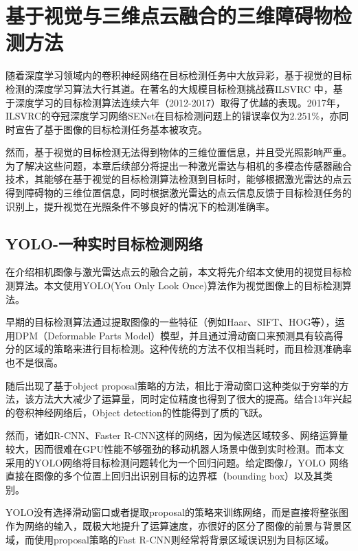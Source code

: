 
\chapter{基于视觉与三维点云融合的三维障碍物检测方法}

随着深度学习领域内的卷积神经网络在目标检测任务中大放异彩，基于视觉的目标检测的深度学习算法大行其道。在著名的大规模目标检测挑战赛ILSVRC 中，基于深度学习的目标检测算法连续六年（2012-2017）取得了优越的表现。2017年，ILSVRC的夺冠深度学习网络SENet在目标检测问题上的错误率仅为$2.251 \%$，亦同时宣告了基于图像的目标检测任务基本被攻克。

然而，基于视觉的目标检测无法得到物体的三维位置信息，并且受光照影响严重。为了解决这些问题，本章后续部分将提出一种激光雷达与相机的多模态传感器融合技术，其能够在基于视觉的目标检测算法检测到目标时，能够根据激光雷达的点云得到障碍物的三维位置信息，同时根据激光雷达的点云信息反馈于目标检测任务的识别上，提升视觉在光照条件不够良好的情况下的检测准确率。

\section{YOLO-一种实时目标检测网络}

在介绍相机图像与激光雷达点云的融合之前，本文将先介绍本文使用的视觉目标检测算法。本文使用YOLO(You Only Look Once)算法作为视觉图像上的目标检测算法。


早期的目标检测算法通过提取图像的一些特征（例如Haar、SIFT、HOG等），运用DPM（Deformable Parts Model）模型，并且通过滑动窗口来预测具有较高得分的区域的策略来进行目标检测。这种传统的方法不仅相当耗时，而且检测准确率也不是很高。

随后出现了基于object proposal策略的方法，相比于滑动窗口这种类似于穷举的方法，该方法大大减少了运算量，同时定位精度也得到了很大的提高。结合13年兴起的卷积神经网络后，Object detection的性能得到了质的飞跃。

然而，诸如R-CNN、Faster R-CNN这样的网络，因为候选区域较多、网络运算量较大，因而很难在GPU性能不够强劲的移动机器人场景中做到实时检测。而本文采用的YOLO网络将目标检测问题转化为一个回归问题。给定图像$I$，YOLO 网络直接在图像的多个位置上回归出识别目标的边界框（bounding box）以及其类别。

YOLO没有选择滑动窗口或者提取proposal的策略来训练网络，而是直接将整张图作为网络的输入，既极大地提升了运算速度，亦很好的区分了图像的前景与背景区域，而使用proposal策略的Fast R-CNN则经常将背景区域误识别为目标区域。

